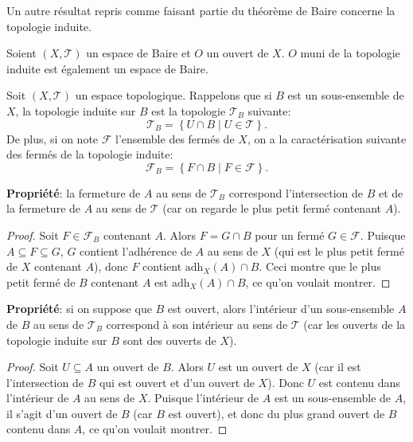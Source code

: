 Un autre résultat repris comme faisant partie du théorème de Baire concerne
la topologie induite.
\begin{thm}\label{baire:ind}
  Soient $(X, \mathcal{T})$ un espace de Baire et $O$ un ouvert de $X$.
  $O$ muni de la topologie induite est également un espace de Baire.
\end{thm}

\begin{rem}[Rappels]
  Soit $(X, \mathcal{T})$ un espace topologique.
  Rappelons que si $B$ est un sous-ensemble de $X$, la topologie
  induite sur $B$ est la topologie $\mathcal{T}_B$ suivante:
  $$\mathcal{T}_B=\left\{U\cap B\mid U\in\mathcal{T}\right\}.$$
  De plus, si on note $\mathcal{F}$ l'ensemble des fermés de $X$,
  on a la caractérisation suivante des fermés de la topologie
  induite:
  $$\mathcal{F}_B=\left\{F\cap B\mid F\in\mathcal{F}\right\}.$$

  \textbf{Propriété}: la fermeture de $A$ au sens de $\mathcal T_B$ correspond
  l'intersection de $B$ et de la fermeture de $A$ au sens
  de $\mathcal T$ (car on regarde le plus petit fermé contenant $A$).

  \begin{proof}
    Soit $F\in\mathcal F_B$ contenant $A$. Alors $F = G\cap B$ pour un
    fermé $G\in\mathcal F$. Puisque $ A \subseteq F\subseteq G$, $G$
    contient l'adhérence de $A$ au sens de $X$ (qui est le plus petit
    fermé de $X$ contenant $A$), donc $F$ contient $\mathrm{adh}_X(A)\cap B$.
    Ceci montre que le plus petit fermé de $B$ contenant $A$
    est $\mathrm{adh}_X(A)\cap B$, ce qu'on voulait montrer.
\end{proof}

  \textbf{Propriété}: si on suppose que $B$ est ouvert, alors l'intérieur d'un
  sous-ensemble $A$ de $B$ au sens de $\mathcal T_B$ correspond à
  son intérieur au sens de $\mathcal T$
  (car les ouverts de la topologie induite sur $B$ sont des
  ouverts de $X$).

  \begin{proof}
    Soit $U\subseteq A$ un ouvert de $B$. Alors $U$ est un
    ouvert de $X$ (car il est l'intersection de $B$ qui est ouvert
    et d'un ouvert de $X$). Donc $U$ est contenu dans l'intérieur
    de $A$ au sens de $X$. Puisque l'intérieur de $A$ est un sous-ensemble
    de $A$, il s'agit d'un ouvert de $B$ (car $B$ est ouvert),
    et donc du plus grand
    ouvert de $B$ contenu dans $A$, ce qu'on voulait montrer.
    \end{proof}
\end{rem}

